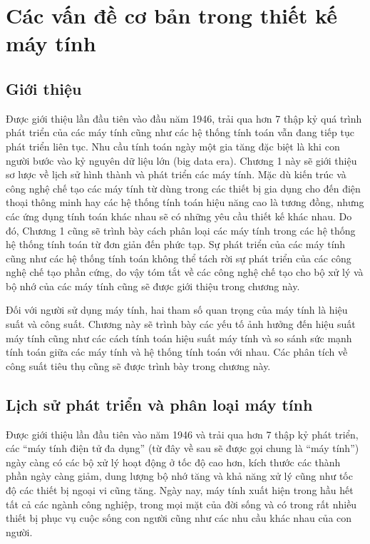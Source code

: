 \chapter{Các vấn đề cơ bản trong thiết kế máy tính}
\label{chp:01}

\section{Giới thiệu}
Được giới thiệu lần đầu tiên vào đầu năm 1946, trải qua hơn 7 thập kỷ quá trình phát triển của các máy tính cũng như các hệ thống tính toán vẫn đang tiếp tục phát triển liên tục. Nhu cầu tính toán ngày một gia tăng đặc biệt là khi con người bước vào kỷ nguyên dữ liệu lớn (big data era). Chương 1 này sẽ giới thiệu sơ lược về lịch sử hình thành và phát triển các máy tính. Mặc dù kiến trúc và công nghệ chế tạo các máy tính từ dùng trong các thiết bị gia dụng cho đến điện thoại thông minh hay các hệ thống tính toán hiệu năng cao là tương đồng, nhưng các ứng dụng tính toán khác nhau sẽ có những yêu cầu thiết kế khác nhau. Do đó, Chương 1 cũng sẽ trình bày cách phân loại các máy tính trong các hệ thống hệ thống tính toán từ đơn giản đến phức tạp. Sự phát triển của các máy tính cũng như các hệ thống tính toán không thể tách rời sự phát triển của các công nghệ chế tạo phần cứng, do vậy tóm tắt về các công nghệ chế tạo cho bộ xử lý và bộ nhớ của các máy tính cũng sẽ được giới thiệu trong chương này.

Đối với người sử dụng máy tính, hai tham số quan trọng của máy tính là hiệu suất và công suất. Chương này sẽ trình bày các yếu tố ảnh hưởng đến hiệu suất máy tính cũng như các cách tính toán hiệu suất máy tính và so sánh sức mạnh tính toán giữa các máy tính và hệ thống tính toán với nhau. Các phân tích về công suất tiêu thụ cũng sẽ được trình bày trong chương này.

\section{Lịch sử phát triển và phân loại máy tính}
\label{sec:history}
Được giới thiệu lần đầu tiên vào năm 1946 và trải qua hơn 7 thập kỷ phát triển, các ``máy tính điện tử đa dụng'' (từ đây về sau sẽ được gọi chung là ``máy tính'') ngày càng có các bộ xử lý hoạt động ở tốc độ cao hơn, kích thước các thành phần ngày càng giảm, dung lượng bộ nhớ tăng và khả năng xử lý cũng như tốc độ các thiết bị ngoại vi cũng tăng. Ngày nay, máy tính xuất hiện trong hầu hết tất cả các ngành công nghiệp, trong mọi mặt của đời sống và có trong rất nhiều thiết bị phục vụ cuộc sống con người cũng như các nhu cầu khác nhau của con người.

